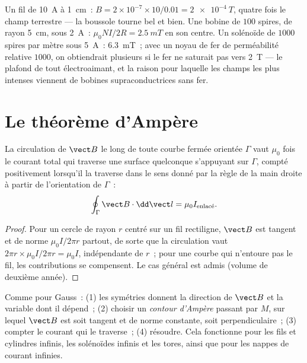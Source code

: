\begin{example}\label{ex:b1:magnetostatics:orders}
Un fil de \qty{10}{A} à \qty{1}{cm}~: $B = 2 \times 10^{-7} \times 10/0.01 =
\qty{2e-4}{T}$, quatre fois le champ terrestre --- la boussole tourne bel et
bien. Une bobine de $100$ spires, de rayon \qty{5}{cm}, sous \qty{2}{A}~: $\mu_0NI/2R =
\qty{2.5}{mT}$ en son centre. Un solénoïde de $1000$ spires par mètre sous
\qty{5}{A}~: \qty{6.3}{mT}~; avec un noyau de fer de perméabilité relative
$1000$, on obtiendrait plusieurs  si le fer ne saturait pas vers
\qty{2}{T} --- le plafond de tout électroaimant, et la raison pour laquelle
les champs les plus intenses viennent de bobines supraconductrices sans fer.
\end{example}

\section{Le théorème d'Ampère}

\begin{theorem}[Ampère]\label{thm:b1:magnetostatics:ampere}
La circulation de $\vect B$ le long de toute courbe fermée orientée $\Gamma$
vaut $\mu_0$ fois le courant total qui traverse une surface quelconque
s'appuyant sur $\Gamma$, compté positivement lorsqu'il la traverse dans le
sens donné par la règle de la main droite à partir de l'orientation de $\Gamma$~:
\[
\oint_\Gamma \vect B\cdot\dd\vect l = \mu_0 I_{\text{enlacé}} .
\]
\end{theorem}

\begin{proof}
Pour un cercle de rayon $r$ centré sur un fil rectiligne, $\vect B$ est
tangent et de norme $\mu_0I/2\pi r$ partout, de sorte que la circulation vaut
$2\pi r \times \mu_0I/2\pi r = \mu_0I$, indépendante de $r$~; pour une courbe
qui n'entoure pas le fil, les contributions se compensent. Le cas général est
admis (volume de deuxième année).
\end{proof}

\begin{method}\label{meth:b1:magnetostatics:ampere}
Comme pour Gauss~: (1) les symétries donnent la direction de $\vect B$ et la
variable dont il dépend~; (2) choisir un \emph{contour d'Ampère} passant par
$M$, sur lequel $\vect B$ est soit tangent et de norme constante, soit
perpendiculaire~; (3) compter le courant qui le traverse~; (4) résoudre. Cela
fonctionne pour les fils et cylindres infinis, les solénoïdes infinis et les
tores, ainsi que pour les nappes de courant infinies.
\end{method}

